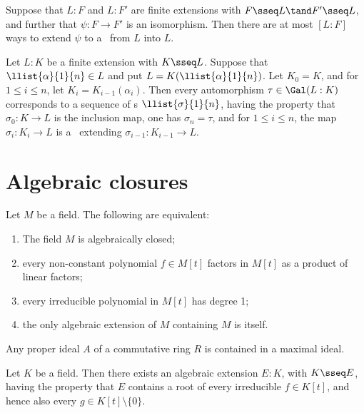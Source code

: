 \documentclass{article}
\begin{document}
  \begin{tcorollary}
    Suppose that \( L:F \) and \( L:F' \) are finite extensions with \( F\sseq L\tand F'\sseq L \), and further that \( \psi:F\to F' \) is an isomorphism. Then there are at most \( [L:F] \) ways to extend \( \psi \) to a \homo~from \( L \) into \( L \).
  \end{tcorollary}

  \begin{tcorollary}
    Let \( L:K \) be a finite extension with \( K\sseq L \). Suppose that \( \llist{\alpha}{1}{n}\in L \) and put \( L=K(\llist{\alpha}{1}{n}) \). Let \( K_0=K \), and for \( 1\leq i\leq n \), let \( K_i=K_{i-1}(\alpha_i) \). Then every automorphism \( \tau\in\Gal(L:K) \) corresponds to a sequence of \homo s \( \llist{\sigma}{1}{n} \), having the property that \( \sigma_0:K\to L \) is the inclusion map, one has \( \sigma_n=\tau \), and for \( 1\leq i\leq n \), the map \( \sigma_i:K_i\to L \) is a \homo~extending \( \sigma_{i-1}:K_{i-1}\to L \).
  \end{tcorollary}

\section{Algebraic closures}
  \begin{lemma}
    Let \( M \) be a field. The following are equivalent:
    \begin{enumerate}[label=(\roman*)]
      \item The field \( M \) is algebraically closed;
      \item every non-constant polynomial \( f\in M[t] \) factors in \( M[t] \) as a product of linear factors;
      \item every irreducible polynomial in \( M[t] \) has degree 1;
      \item the only algebraic extension of \( M \) containing \( M \) is itself.
    \end{enumerate}
  \end{lemma}

  \begin{tproposition}
    Any proper ideal \( A \) of a commutative ring \( R \) is contained in a maximal ideal.
  \end{tproposition}

  \begin{lemma}
    Let \( K \) be a field. Then there exists an algebraic extension \( E:K \), with \( K\sseq E \), having the property that \( E \) contains a root of every irreducible \( f\in K[t] \), and hence also every \( g\in K[t]\setminus\{ 0 \} \).
  \end{lemma}
\end{document}
